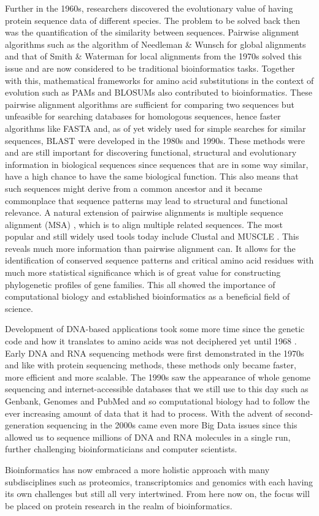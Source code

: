 Further in the 1960s, researchers discovered the evolutionary value of having protein sequence data of different species. The problem to be solved back then was the quantification of the similarity between sequences. Pairwise alignment algorithms such as the algorithm of Needleman \& Wunsch \cite{global} for global alignments and that of Smith \& Waterman \cite{local} for local alignments from the 1970s solved this issue and are now considered to be traditional bioinformatics tasks. Together with this, mathematical frameworks for amino acid substitutions in the context of evolution such as PAMs and BLOSUMs also contributed to bioinformatics. These pairwise alignment algorithms are sufficient for comparing two sequences but unfeasible for searching databases for homologous sequences, hence faster algorithms like FASTA \cite{fasta} and, as of yet widely used for simple searches for similar sequences, BLAST \cite{blast} were developed in the 1980s and 1990s. These methods were and are still important for discovering functional, structural and evolutionary information in biological sequences since sequences that are in some way similar, have a high chance to have the same biological function. This also means that such sequences might derive from a common ancestor and it became commonplace that sequence patterns may lead to structural and functional relevance. A natural extension of pairwise alignments is multiple sequence alignment (MSA) \cite{msa}, which is to align multiple related sequences. The most popular and still widely used tools today include Clustal \cite{clustal} and MUSCLE \cite{muscle}. This reveals much more information than pairwise alignment can. It allows for the identification of conserved sequence patterns and critical amino acid residues with much more statistical significance which is of great value for constructing phylogenetic profiles of gene families. This all showed the importance of computational biology and established bioinformatics as a beneficial field of science.

Development of DNA-based applications took some more time since the genetic code and how it translates to amino acids was not deciphered yet until 1968 \cite{codon}. Early DNA and RNA sequencing methods were first demonstrated in the 1970s \cite{Sanger1977-ks, rna} and like with protein sequencing methods, these methods only became faster, more efficient and more scalable. The 1990s saw the appearance of whole genome sequencing and internet-accessible databases that we still use to this day such as Genbank, Genomes and PubMed and so computational biology had to follow the ever increasing amount of data that it had to process. With the advent of second-generation sequencing in the 2000s came even more Big Data issues since this allowed us to sequence millions of DNA and RNA molecules in a single run, further challenging bioinformaticians and computer scientists.

Bioinformatics has now embraced a more holistic approach with many subdisciplines such as proteomics, transcriptomics and genomics with each having its own challenges but still all very intertwined. From here now on, the focus will be placed on protein research in the realm of bioinformatics.